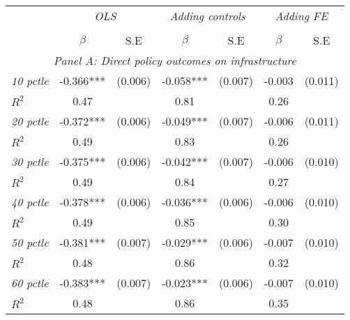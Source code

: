 \begin{tabular}{lcccccc}


\hline
\hline


\multicolumn{1}{l}{} & \multicolumn{2}{c}{\textit{OLS}} & \multicolumn{2}{c}{\textit{Adding controls}} & \multicolumn{2}{c}{\textit{Adding FE}}   \\ 
\cmidrule(l{1mm}r{1mm}){2-3} \cmidrule(l{1mm}r{1mm}){4-5} \cmidrule(l{1mm}r{1mm}){6-7}   \\
& $\beta$ & S.E & $\beta$ & S.E & $\beta$ & S.E \\
\hline

\multicolumn{7}{c}{\textit{Panel   A: Direct policy outcomes on infrastructure}}   \\                                                          

\textit{10 pctle}          		  &  -0.366***    & (0.006)      &   -0.058***        &  (0.007)      &     -0.003  &    (0.011)        \\
$R^{2}$			           	   		  &  0.47   & 	   &     0.81   	&		 &     0.26   &   \\
									  
\textit{20 pctle}          		  &  -0.372***    & (0.006)      &   -0.049***        &  (0.007)      &     -0.006  &    (0.011)      \\
$R^{2}$			           	   		  &  0.49   & 	   &     0.83   	&		 &     0.26   &   \\
									  
\textit{30 pctle}          		  &  -0.375***    & (0.006)      &   -0.042***        &  (0.007)      &     -0.006  &    (0.010)      \\
$R^{2}$			           	   		  &  0.49   & 	   &     0.84   	&		 &     0.27   &   \\
									  
\textit{40 pctle}          		  &  -0.378***    & (0.006)      &   -0.036***        &  (0.006)      &     -0.006  &    (0.010)      \\
$R^{2}$			           	   		  &  0.49   & 	   &     0.85   	&		 &     0.30   &  \\
									  
\textit{50 pctle}          		  &  -0.381***    & (0.007)      &   -0.029***        &  (0.006)      &     -0.007  &    (0.010)       \\
$R^{2}$			           	   		  &  0.48   & 	   &     0.86   	&		 &     0.32   &   \\

\textit{60 pctle}          		  &  -0.383***    & (0.007)      &   -0.023***        &  (0.006)      &     -0.007  &    (0.010)       \\
$R^{2}$			           	   		  &  0.48   & 	   &     0.86   	&		 &     0.35   &  \\



\end{tabular}
